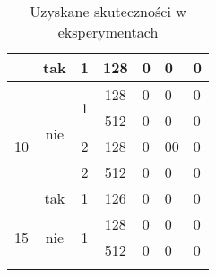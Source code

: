 \begin{table}[ht]
{\begin{tabular}{cccclll}
        \multicolumn{1}{|c|}{}                    & \multicolumn{1}{c|}{tak}                  & \multicolumn{1}{c|}{1}                  & \multicolumn{1}{c|}{128}                        & \multicolumn{1}{l|}{0}     & \multicolumn{1}{l|}{0}     & \multicolumn{1}{l|}{0}                    \\ \hline
        \multicolumn{1}{|c|}{\multirow{5}{*}{10}} & \multicolumn{1}{c|}{\multirow{4}{*}{nie}} & \multicolumn{1}{c|}{\multirow{2}{*}{1}} & \multicolumn{1}{c|}{128}                        & \multicolumn{1}{l|}{0}     & \multicolumn{1}{l|}{0}     & \multicolumn{1}{l|}{0}                    \\ \cline{4-7} 
        \multicolumn{1}{|c|}{}                    & \multicolumn{1}{c|}{}                     & \multicolumn{1}{c|}{}                   & \multicolumn{1}{c|}{512}                        & \multicolumn{1}{l|}{0}     & \multicolumn{1}{l|}{0}     & \multicolumn{1}{l|}{0}                    \\ \cline{3-7} 
        \multicolumn{1}{|c|}{}                    & \multicolumn{1}{c|}{}                     & \multicolumn{1}{c|}{2}                  & \multicolumn{1}{c|}{128}                        & \multicolumn{1}{l|}{0}     & \multicolumn{1}{l|}{00}    & \multicolumn{1}{l|}{0}                    \\ \cline{3-7} 
        \multicolumn{1}{|c|}{}                    & \multicolumn{1}{c|}{}                     & \multicolumn{1}{c|}{2}                  & \multicolumn{1}{c|}{512}                        & \multicolumn{1}{l|}{0}     & \multicolumn{1}{l|}{0}     & \multicolumn{1}{l|}{0}                    \\ \cline{2-7} 
        \multicolumn{1}{|c|}{}                    & \multicolumn{1}{c|}{tak}                  & \multicolumn{1}{c|}{1}                  & \multicolumn{1}{c|}{126}                        & \multicolumn{1}{l|}{0}     & \multicolumn{1}{l|}{0}     & \multicolumn{1}{l|}{0}                    \\ \hline
        \multicolumn{1}{|c|}{\multirow{2}{*}{15}} & \multicolumn{1}{c|}{\multirow{2}{*}{nie}} & \multicolumn{1}{c|}{\multirow{2}{*}{1}} & \multicolumn{1}{c|}{128}                        & \multicolumn{1}{l|}{0}     & \multicolumn{1}{l|}{0}     & \multicolumn{1}{l|}{0}                    \\ \cline{4-7} 
        \multicolumn{1}{|c|}{}                    & \multicolumn{1}{c|}{}                     & \multicolumn{1}{c|}{}                   & \multicolumn{1}{c|}{512}                        & \multicolumn{1}{l|}{0}     & \multicolumn{1}{l|}{0}     & \multicolumn{1}{l|}{0}                    \\ \hline
                                                  &                                           &                                         &                                                 &                            &                            &                                          
        \end{tabular}}
    \caption{Uzyskane skuteczności w eksperymentach} 
    \label{wyniki}
\end{table} 
